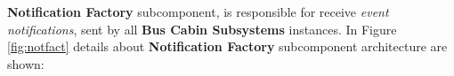 \textbf{Notification Factory} subcomponent, is responsible for receive \textit{event notifications}, sent by all \textbf{Bus Cabin Subsystems} instances. In Figure \ref{fig:notfact} details about \textbf{Notification Factory} subcomponent architecture are shown:








